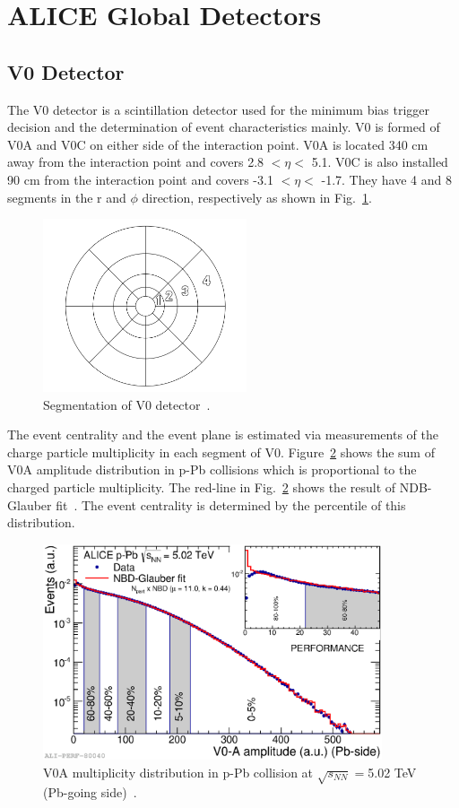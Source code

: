 \section{ALICE Global Detectors}
\label{sec_3_ALICEglobal}
\subsection{V0 Detector}
The V0 detector is a scintillation detector used for the minimum bias trigger decision and the determination of event characteristics mainly. 
V0 is formed of V0A and V0C on either side of the interaction point. 
V0A is located 340 cm away from the interaction point and covers 2.8 $< \eta < $ 5.1. 
V0C is also installed 90 cm from the interaction point and covers -3.1 $< \eta < $ -1.7.
They have 4 and 8 segments in the r and $\phi$ direction, respectively as shown in Fig.~\ref{fig_3_v0det}. 

\begin{figure}[!h]
  \centering
  \includegraphics[width=6cm]{chap3/figure/V0/CrossSection_V0.png}
  \caption{Segmentation of V0 detector~\cite{bib_aprv1}.}
  \label{fig_3_v0det}
\end{figure}

The event centrality and the event plane is estimated via measurements of the charge particle multiplicity in each segment of V0. 
Figure~\ref{fig_3_v0multi} shows the sum of V0A amplitude distribution in p-Pb collisions which is proportional to the charged particle multiplicity\cite{bib_v0multi}.
The red-line in Fig.~\ref{fig_3_v0multi} shows the result of NDB-Glauber fit~\cite{bib_ndbglauber1,bib_ndbglauber2,bib_ndbglauber3,bib_ndbglauber4}. 
The event centrality is determined by the percentile of this distribution. 
\begin{figure}[!h]
  \centering
  \includegraphics[width=10cm]{chap3/figure/V0/V0AMulti_pPb.eps}
  \caption{V0A multiplicity distribution in p-Pb collision at $\sqrt{s_{NN}}=$5.02 TeV (Pb-going side)~\cite{bib_v0multi}.}
  \label{fig_3_v0multi}
\end{figure}

